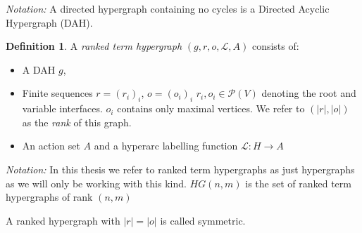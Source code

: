 \documentclass[12pt]{article}
\theoremstyle{definition}
\newtheorem{definition}[theorem]{Definition}
\renewcommand{\P}{\mathcal{P}}
\newcommand{\1}{\mathbbm{1}}
\renewcommand{\L}{\mathcal{L}}
\begin{document}
\emph{Notation:} A directed hypergraph containing no cycles is a Directed Acyclic Hypergraph (DAH).

\begin{definition}
A \emph{ranked term hypergraph} $(g, r, o, \L, A)$ consists of:
\begin{itemize}
\item A DAH $g$,
\item Finite sequences $r = (r_i)_i$, $o = (o_i)_i$ $r_i, o_i\in \P(V)$ denoting the root and variable interfaces. $o_i$ contains only maximal vertices. We refer to $(|r|, |o|)$ as the \emph{rank} of this graph.
\item An action set $A$ and a hyperarc labelling function $\L: H\to A$
\end{itemize}
\end{definition}
\emph{Notation:} In this thesis we refer to ranked term hypergraphs as just hypergraphs as we will only be working with this kind. $HG(n,m)$ is the set of ranked term  hypergraphs of rank $(n,m)$

A ranked hypergraph with $|r| = |o|$ is called symmetric.
\end{document}

